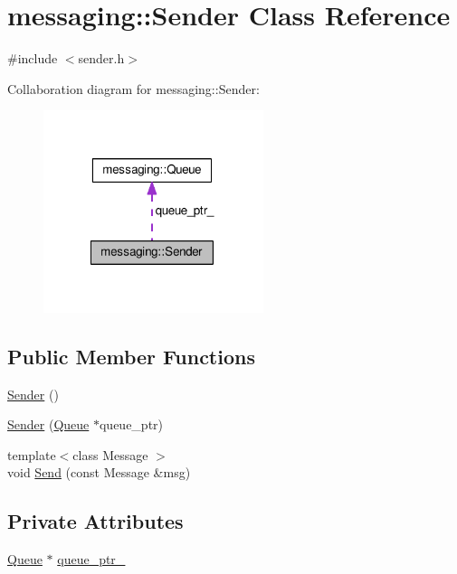 \hypertarget{classmessaging_1_1Sender}{\section{messaging\-:\-:Sender Class Reference}
\label{classmessaging_1_1Sender}
}


{\ttfamily \#include $<$sender.\-h$>$}



Collaboration diagram for messaging\-:\-:Sender\-:
\nopagebreak
\begin{figure}[H]
\begin{center}
\leavevmode
\includegraphics[width=182pt]{classmessaging_1_1Sender__coll__graph}
\end{center}
\end{figure}
\subsection*{Public Member Functions}
\begin{DoxyCompactItemize}
\item 
\hyperlink{classmessaging_1_1Sender_a40d7ba2c5bd94d249b47b518466870dc}{Sender} ()
\item 
\hyperlink{classmessaging_1_1Sender_a55b2718ff332f741494d3d90c7b83de2}{Sender} (\hyperlink{classmessaging_1_1Queue}{Queue} $\ast$queue\-\_\-ptr)
\item 
{\footnotesize template$<$class Message $>$ }\\void \hyperlink{classmessaging_1_1Sender_a5f8d8f2fa560996d8f224cc0f10d8f8c}{Send} (const Message \&msg)
\end{DoxyCompactItemize}
\subsection*{Private Attributes}
\begin{DoxyCompactItemize}
\item 
\hyperlink{classmessaging_1_1Queue}{Queue} $\ast$ \hyperlink{classmessaging_1_1Sender_a56aa7e425615eae331039cd66346b56c}{queue\-\_\-ptr\-\_\-}
\end{DoxyCompactItemize}


